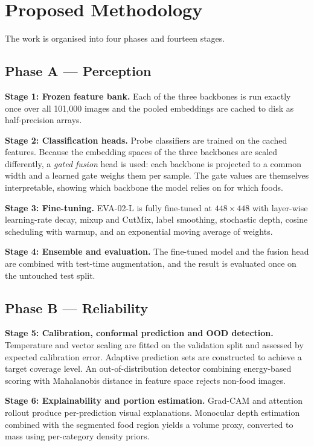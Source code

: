 \documentclass[12pt,a4paper,oneside]{report}
\begin{document}
\chapter{Proposed Methodology}
\label{ch:methodology}

The work is organised into four phases and fourteen stages.

\section{Phase A --- Perception}

\textbf{Stage 1: Frozen feature bank.} Each of the three backbones is run
exactly once over all 101{,}000 images and the pooled embeddings are cached to
disk as half-precision arrays.

\textbf{Stage 2: Classification heads.} Probe classifiers are trained on the
cached features. Because the embedding spaces of the three backbones are scaled
differently, a \emph{gated fusion} head is used: each backbone is projected to a
common width and a learned gate weighs them per sample. The gate values are
themselves interpretable, showing which backbone the model relies on for which
foods.

\textbf{Stage 3: Fine-tuning.} EVA-02-L is fully fine-tuned at $448\times448$
with layer-wise learning-rate decay, mixup and CutMix, label smoothing, stochastic
depth, cosine scheduling with warmup, and an exponential moving average of
weights.

\textbf{Stage 4: Ensemble and evaluation.} The fine-tuned model and the fusion
head are combined with test-time augmentation, and the result is evaluated once
on the untouched test split.

\section{Phase B --- Reliability}

\textbf{Stage 5: Calibration, conformal prediction and OOD detection.}
Temperature and vector scaling are fitted on the validation split and assessed
by expected calibration error. Adaptive prediction sets are constructed to
achieve a target coverage level. An out-of-distribution detector combining
energy-based scoring with Mahalanobis distance in feature space rejects non-food
images.

\textbf{Stage 6: Explainability and portion estimation.} Grad-CAM and attention
rollout produce per-prediction visual explanations. Monocular depth estimation
combined with the segmented food region yields a volume proxy, converted to mass
using per-category density priors.
\end{document}
